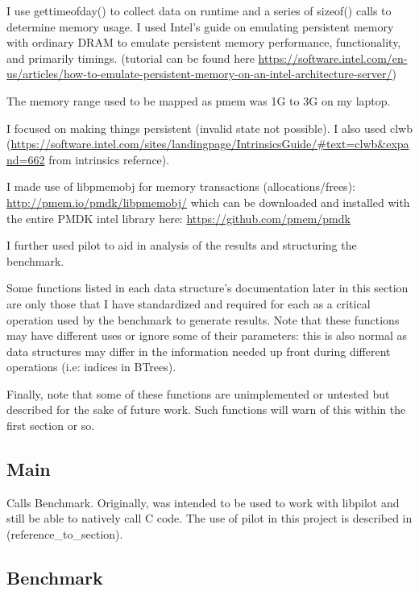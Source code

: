 \documentclass[twocolumn]{article}
\begin{document}

I use gettimeofday() to collect data on runtime and a series of sizeof() calls
to determine memory usage.  I used Intel's guide on emulating persistent memory
with ordinary DRAM to emulate persistent memory performance, functionality, and
primarily timings. (tutorial can be found here
\url{https://software.intel.com/en-us/articles/how-to-emulate-persistent-memory-on-an-intel-architecture-server/})

The memory range used to be mapped as pmem was 1G to 3G on my laptop.

I focused on making things persistent (invalid state not possible). I also
used clwb
(\url{https://software.intel.com/sites/landingpage/IntrinsicsGuide/#text=clwb&expand=662}
from intrinsics refernce).

I made use of libpmemobj for memory transactions (allocations/frees):
\url{http://pmem.io/pmdk/libpmemobj/}
which can be downloaded and installed with the entire PMDK intel library here:
\url{https://github.com/pmem/pmdk}

I further used pilot to aid in analysis of the results and structuring the
benchmark.

Some functions listed in each data structure's documentation later in this
section are only those that I have standardized and required for each as a
critical operation used by the benchmark to generate results. Note that these
functions may have different uses or ignore some of their parameters: this is
also normal as data structures may differ in the information needed up front
during different operations (i.e: indices in BTrees).

Finally, note that some of these functions are unimplemented or untested but
described for the sake of future work. Such functions will warn of this within
the first section or so.

\subsection{Main}

Calls Benchmark. Originally, was intended to be used to work with libpilot and
still be able to natively call C code. The use of pilot in this project is
described in (reference\_to\_section).

\subsection{Benchmark}
\end{document}
